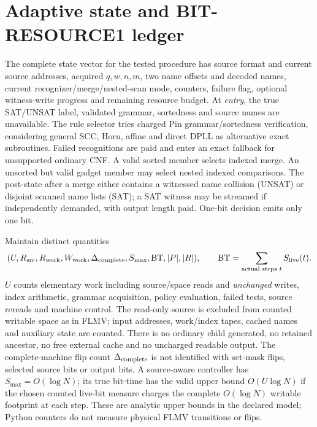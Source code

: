 \documentclass[11pt]{article}
\begin{document}
\section{Adaptive state and BIT-RESOURCE1 ledger}
The complete state vector for the tested procedure has source format and current source addresses, acquired \(q,w,n,m\), two name offsets and decoded names, current recognizer/merge/nested-scan mode, counters, failure flag, optional witness-write progress and remaining resource budget. At \emph{entry}, the true SAT/UNSAT label, validated grammar, sortedness and source names are unavailable. The rule selector tries charged Pin grammar/sortedness verification, considering general SCC, Horn, affine and direct DPLL as alternative exact subroutines. Failed recognitions are paid and enter an exact fallback for unsupported ordinary CNF. A valid sorted member selects indexed merge. An unsorted but valid gadget member may select nested indexed comparisons. The post-state after a merge either contains a witnessed name collision (UNSAT) or disjoint scanned name lists (SAT); a SAT witness may be streamed if independently demanded, with output length paid. One-bit decision emits only one bit.

Maintain distinct quantities
\[
 (U,R_{\rm src},R_{\rm work},W_{\rm work},\Delta_{\rm complete},
 S_{\max},\mathrm{BT},|P|,|R|),\qquad
 \mathrm{BT}=\sum_{\text{actual steps }t}S_{\rm live}(t).
\]
\(U\) counts elementary work including source/space reads and \emph{unchanged} writes, index arithmetic, grammar acquisition, policy evaluation, failed tests, source rereads and machine control. The read-only source is excluded from counted writable space as in FLMV; input addresses, work/index tapes, cached names and auxiliary state are counted. There is no ordinary child generated, no retained ancestor, no free external cache and no uncharged readable output. The complete-machine flip count \(\Delta_{\rm complete}\) is not identified with set-mask flips, selected source bits or output bits. A source-aware controller has \(S_{\max}=O(\log N)\); its true bit-time has the valid upper bound \(O(U\log N)\) if the chosen counted live-bit measure charges the complete \(O(\log N)\) writable footprint at each step. These are analytic upper bounds in the declared model; Python counters do not measure physical FLMV transitions or flips.
\end{document}
